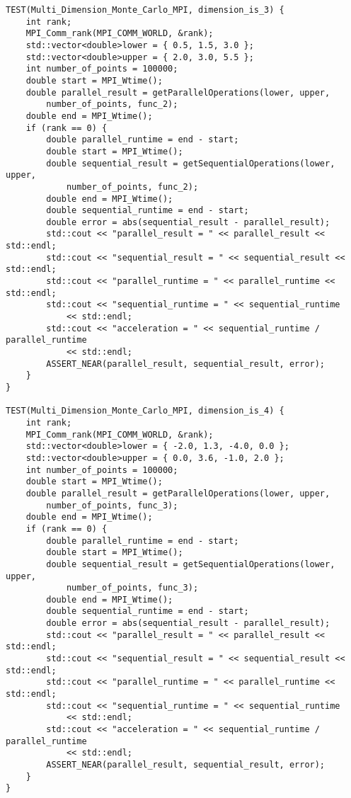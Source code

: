 \documentclass{report}
\begin{document}
\begin{lstlisting}
TEST(Multi_Dimension_Monte_Carlo_MPI, dimension_is_3) {
    int rank;
    MPI_Comm_rank(MPI_COMM_WORLD, &rank);
    std::vector<double>lower = { 0.5, 1.5, 3.0 };
    std::vector<double>upper = { 2.0, 3.0, 5.5 };
    int number_of_points = 100000;
    double start = MPI_Wtime();
    double parallel_result = getParallelOperations(lower, upper,
        number_of_points, func_2);
    double end = MPI_Wtime();
    if (rank == 0) {
        double parallel_runtime = end - start;
        double start = MPI_Wtime();
        double sequential_result = getSequentialOperations(lower, upper,
            number_of_points, func_2);
        double end = MPI_Wtime();
        double sequential_runtime = end - start;
        double error = abs(sequential_result - parallel_result);
        std::cout << "parallel_result = " << parallel_result << std::endl;
        std::cout << "sequential_result = " << sequential_result << std::endl;
        std::cout << "parallel_runtime = " << parallel_runtime << std::endl;
        std::cout << "sequential_runtime = " << sequential_runtime
            << std::endl;
        std::cout << "acceleration = " << sequential_runtime / parallel_runtime
            << std::endl;
        ASSERT_NEAR(parallel_result, sequential_result, error);
    }
}

TEST(Multi_Dimension_Monte_Carlo_MPI, dimension_is_4) {
    int rank;
    MPI_Comm_rank(MPI_COMM_WORLD, &rank);
    std::vector<double>lower = { -2.0, 1.3, -4.0, 0.0 };
    std::vector<double>upper = { 0.0, 3.6, -1.0, 2.0 };
    int number_of_points = 100000;
    double start = MPI_Wtime();
    double parallel_result = getParallelOperations(lower, upper,
        number_of_points, func_3);
    double end = MPI_Wtime();
    if (rank == 0) {
        double parallel_runtime = end - start;
        double start = MPI_Wtime();
        double sequential_result = getSequentialOperations(lower, upper,
            number_of_points, func_3);
        double end = MPI_Wtime();
        double sequential_runtime = end - start;
        double error = abs(sequential_result - parallel_result);
        std::cout << "parallel_result = " << parallel_result << std::endl;
        std::cout << "sequential_result = " << sequential_result << std::endl;
        std::cout << "parallel_runtime = " << parallel_runtime << std::endl;
        std::cout << "sequential_runtime = " << sequential_runtime
            << std::endl;
        std::cout << "acceleration = " << sequential_runtime / parallel_runtime
            << std::endl;
        ASSERT_NEAR(parallel_result, sequential_result, error);
    }
}


\end{lstlisting}
\end{document}
